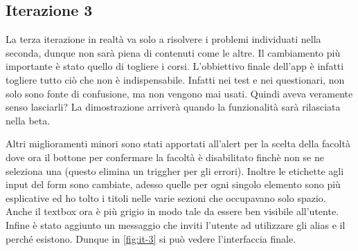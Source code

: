 \documentclass[Lau, oneside, noexaminfo]{sapthesis}%
\begin{document}
\subsection{Iterazione 3}
La terza iterazione in realtà va solo a risolvere i problemi individuati nella seconda, dunque non sarà piena di contenuti come le altre.
Il cambiamento più importante è stato quello di togliere i corsi. L'obbiettivo finale dell'app è infatti togliere tutto ciò che non è indispensabile. Infatti nei test e nei questionari, non solo sono fonte di confusione, ma non vengono mai usati. Quindi aveva veramente senso lasciarli? La dimostrazione arriverà quando la funzionalità sarà rilasciata nella beta.

Altri miglioramenti minori sono stati apportati all'alert per la scelta della facoltà dove ora il bottone per confermare la facoltà è disabilitato finchè non se ne seleziona una (questo elimina un triggher per gli errori). Inoltre le etichette agli input del form sono cambiate, adesso quelle per ogni singolo elemento sono più esplicative ed ho tolto i titoli nelle varie sezioni che occupavano solo spazio. Anche il textbox ora è più grigio in modo tale da essere ben visibile all'utente. Infine è stato aggiunto un messaggio che inviti l'utente ad utilizzare gli alias e il perché esistono. Dunque in \ref{fig:it-3} si può vedere l'interfaccia finale.
\end{document}
